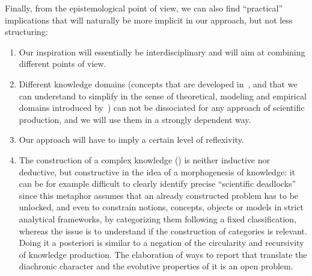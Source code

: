 

Finally, from the epistemological point of view, we can also find ``practical'' implications that will naturally be more implicit in our approach, but not less structuring:

\begin{enumerate}
	\item Our inspiration will essentially be interdisciplinary and will aim at combining different points of view.
	\item Different knowledge domains (concepts that are developed in~\cite{raimbault2017applied}, and that we can understand to simplify in the sense of theoretical, modeling and empirical domains introduced by~\cite{livet2010}) can not be dissociated for any approach of scientific production, and we will use them in a strongly dependent way.
	\item Our approach will have to imply a certain level of reflexivity.
	\item The construction of a complex knowledge (\cite{morin1991methode}) is neither inductive nor deductive, but constructive in the idea of a morphogenesis of knowledge: it can be for example difficult to clearly identify precise ``scientific deadlocks'' since this metaphor assumes that an already constructed problem has to be unlocked, and even to constrain notions, concepts, objects or models in strict analytical frameworks, by categorizing them following a fixed classification, whereas the issue is to understand if the construction of categories is relevant. Doing it a posteriori is similar to a negation of the circularity and recursivity of knowledge production. The elaboration of ways to report that translate the diachronic character and the evolutive properties of it is an open problem.
\end{enumerate}














